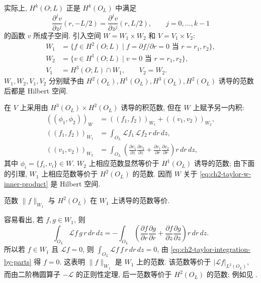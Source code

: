实际上, $H^k(O;L)$ 正是 $H^k(O_L)$ 中满足
\[
\frac{\partial^jv}{\partial z^j}(r,-L/2)
=\frac{\partial^jv}{\partial z^j}(r,L/2),
\qquad j=0,\ldots,k-1
\]
的函数 $v$ 所成子空间. 引入空间 $W=W_1\times W_2$ 和 $V=V_1\times V_2$:
\[
\begin{aligned}
W_1&=\{f\in H^2(O;L)\mid f=\partial f/\partial r=0
\text{ 当 }r=r_1,r_2\},\\
W_2&=\{v\in H^1(O;L)\mid v=0\text{ 当 }r=r_1,r_2\},\\
V_1&=H^3(O;L)\cap W_1,\qquad V_2=W_2.
\end{aligned}
\]
$W_1,W_2,V_1,V_2$ 分别赋予由 $H^2(O_L),H^1(O_L),H^3(O_L),H^2(O_L)$ 诱导的范数后都是 Hilbert 空间.

\hypertarget{chapter-02-page-169}{}
在 $V$ 上采用由 $H^3(O_L)\times H^2(O_L)$ 诱导的积范数, 但在 $W$ 上赋予另一内积:
\begin{equation}
\begin{aligned}
((\phi_1,\phi_2))_W
&=((f_1,f_2))_{W_1}+((v_1,v_2))_{W_2},\\
((f_1,f_2))_{W_1}
&=\int_{O_L}\mathcal Lf_1\,\mathcal Lf_2\,r\,dr\,dz,\\
((v_1,v_2))_{W_2}
&=\int_{O_L}\left(
\frac{\partial v_1}{\partial z}\frac{\partial v_2}{\partial z}
+\frac{\partial v_1}{\partial r}\frac{\partial v_2}{\partial r}
\right)r\,dr\,dz,
\end{aligned}
\label{eq:ch2-taylor-w-inner-product}
\end{equation}
其中 $\phi_i=\{f_i,v_i\}\in W$. $W_2$ 上相应范数显然等价于 $H^1(O_L)$ 诱导的范数; 由下面的引理, $W_1$ 上相应范数等价于 $H^2(O_L)$ 的范数. 因而 $W$ 关于 \eqref{eq:ch2-taylor-w-inner-product} 是 Hilbert 空间.

\begin{Lemma}
\label{lem:ch2-taylor-w1-norm-equivalence}
范数 $\lVert f\rVert_{W_1}$ 与 $H^2(O_L)$ 在 $W_1$ 上诱导的范数等价.
\end{Lemma}

\begin{Proof}
容易看出, 若 $f,g\in W_1$, 则
\begin{equation}
\int_{O_L}\mathcal Lf\,g\,r\,dr\,dz
=-\int_{O_L}\left(
\frac{\partial f}{\partial r}\frac{\partial g}{\partial r}
+\frac{\partial f}{\partial z}\frac{\partial g}{\partial z}
\right)r\,dr\,dz.
\label{eq:ch2-taylor-integration-by-parts}
\end{equation}
所以若 $f\in W_1$ 且 $\mathcal Lf=0$, 则 $\int_{O_L}\mathcal Lf\,f\,r\,dr\,dz=0$, 由 \eqref{eq:ch2-taylor-integration-by-parts} 得 $f=0$. 这表明 $\lVert f\rVert_{W_1}$ 是 $W_1$ 上的范数. 该范数等价于 $|\mathcal Lf|_{L^2(O_L)}$, 而由二阶椭圆算子 $-\mathcal L$ 的正则性定理, 后一范数等价于 $H^2(O_L)$ 的范数; 例如见 .
\end{Proof}

